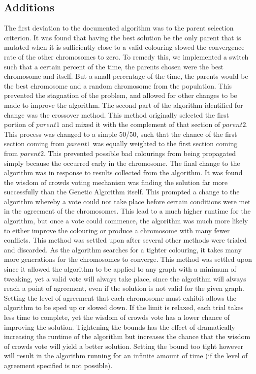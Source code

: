 \subsection{Additions}
\label{genAdditions}
The first deviation to the documented algorithm was to the parent selection criterion. It was found that having the best solution be the only parent that is mutated when it is sufficiently close to a valid colouring slowed the convergence rate of the other chromosomes to zero. To remedy this, we implemented a switch such that a certain percent of the time, the parents chosen were the best chromosome and itself. But a small percentage of the time, the parents would be the best chromosome and a random chromosome from the population. This prevented the stagnation of the problem, and allowed for other changes to be made to improve the algorithm. The second part of the algorithm identified for change was the crossover method. This method originally selected the first portion of $parent1$ and mixed it with the complement of that section of $parent2$. This process was changed to a simple 50/50, such that the chance of the first section coming from $parent1$ was equally weighted to the first section coming from $parent2$. This prevented possible bad colourings from being propagated simply because the occurred early in the chromosome. 
The final change to the algorithm was in response to results collected from the algorithm. It was found the wisdom of crowds voting mechanism was finding the solution far more successfully than the Genetic Algorithm itself. This prompted a change to the algorithm whereby a vote could not take place before certain conditions were met in the agreement of the chromosomes. This lead to a much higher runtime for the algorithm, but once a vote could commence, the algorithm was much more likely to either improve the colouring or produce a chromosome with many fewer conflicts. This method was settled upon after several other methods were trialed and discarded. As the algorithm searches for a tighter colouring, it takes many more generations for the chromosomes to converge. This method was settled upon since it allowed the algorithm to be applied to any graph with a minimum of tweaking, yet a valid vote will always take place, since the algorithm will always reach a point of agreement, even if the solution is not valid for the given graph. Setting the level of agreement that each chromosome must exhibit allows the algorithm to be sped up or slowed down. If the limit is relaxed, each trial takes less time to complete, yet the wisdom of crowds vote has a lower chance of improving the solution. Tightening the bounds has the effect of dramatically increasing the runtime of the algorithm but increases the chance that the wisdom of crowds vote will yield a better solution. Setting the bound too tight however will result in the algorithm running for an infinite amount of time (if the level of agreement specified is not possible).
